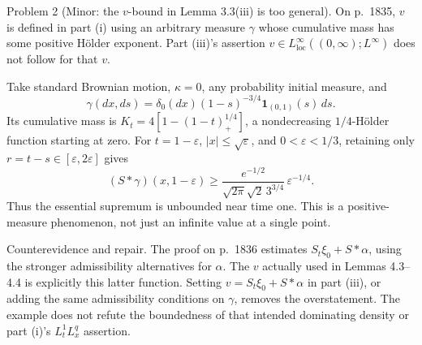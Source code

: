 \documentclass[10pt]{article}
\begin{document}
Problem 2 (Minor: the \(v\)-bound in Lemma 3.3(iii) is too general).  On p. 1835, \(v\) is defined in part (i) using an arbitrary measure \(\gamma\) whose cumulative mass has some positive Hölder exponent. Part (iii)’s assertion \(v\in L^\infty_{\mathrm{loc}}((0,\infty);L^\infty)\) does not follow for that \(v\).\par
Take standard Brownian motion, \(\kappa=0\), any probability initial measure, and \[\gamma(dx,ds)=\delta_0(dx)(1-s)^{-3/4}\mathbf1_{(0,1)}(s)\,ds.\] Its cumulative mass is \(K_t=4[1-(1-t)_+^{1/4}]\), a nondecreasing \(1/4\)-Hölder function starting at zero. For \(t=1-\varepsilon\), \(|x|\leq\sqrt\varepsilon\), and \(0<\varepsilon<1/3\), retaining only \(r=t-s\in[\varepsilon,2\varepsilon]\) gives \[(S*\gamma)(x,1-\varepsilon)
\geq
\frac{e^{-1/2}}{\sqrt{2\pi}\sqrt2\,3^{3/4}}\,
\varepsilon^{-1/4}.\] Thus the essential supremum is unbounded near time one. This is a positive-measure phenomenon, not just an infinite value at a single point.\par
Counterevidence and repair. The proof on p. 1836 estimates \(S_t\xi_0+S*\alpha\), using the stronger admissibility alternatives for \(\alpha\). The \(v\) actually used in Lemmas 4.3–4.4 is explicitly this latter function. Setting \(v=S_t\xi_0+S*\alpha\) in part (iii), or adding the same admissibility conditions on \(\gamma\), removes the overstatement. The example does not refute the boundedness of that intended dominating density or part (i)’s \(L^1_tL^q_x\) assertion.\par
\end{document}
